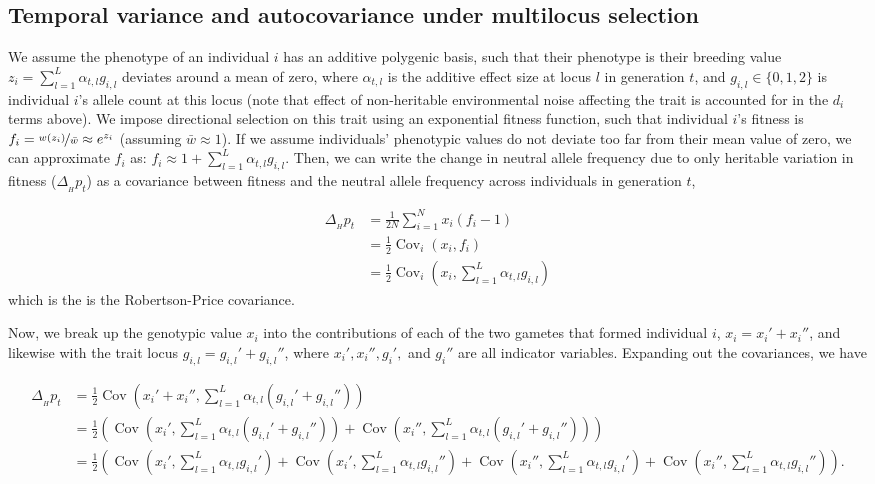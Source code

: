 \documentclass[11pt]{article}
\DeclareMathOperator{\cov}{Cov}
\begin{document}
\subsection{Temporal variance and autocovariance under multilocus selection}
\label{ap:multilocus}

We assume the phenotype of an individual $i$ has an additive polygenic basis,
such that their phenotype is their breeding value $z_i = \sum_{l=1}^L
\alpha_{t,l} g_{i,l}$ deviates around a mean of zero, where $\alpha_{t,l}$ is
the additive effect size at locus $l$ in generation $t$, and $g_{i,l} \in
\{0,1,2\}$ is individual $i$'s allele count at this locus (note that effect of
non-heritable environmental noise affecting the trait is accounted for in the
$d_i$ terms above). We impose directional selection on this trait using an
exponential fitness function, such that individual $i$'s fitness is $f_i =
\nicefrac{w(z_i)}{\bar{w}} \approx e^{z_i}$ (assuming $\bar{w} \approx 1$). If
we assume individuals' phenotypic values do not deviate too far from their mean
value of zero, we can approximate $f_i$ as: $f_i \approx 1 + \sum_{l=1}^L
\alpha_{t,l} g_{i,l}$. Then, we can write the change in neutral allele
frequency due to only heritable variation in fitness ($\Delta_{_H} p_t$) as a
covariance between fitness and the neutral allele frequency across individuals
in generation $t$, 

\begin{align}
  \Delta_{_H} p_t &= \frac{1}{2N} \sum_{i=1}^N x_i \left(f_i - 1\right) \\
                  &= \frac{1}{2} \cov_i(x_i, f_i) \\
                  &= \frac{1}{2} \cov_i(x_i, \sum_{l=1}^L \alpha_{t,l} g_{i,l})
\end{align}
%
which is the is the Robertson-Price covariance.

Now, we break up the genotypic value $x_i$ into the contributions of each of
the two gametes that formed individual $i$, $x_i = x_i' + x_i''$, and likewise
with the trait locus $g_{i,l} = g_{i,l}' + g_{i,l}''$, where $x_i', x_i'',
g_i',$ and $g_i''$ are all indicator variables. Expanding out the covariances, we have

\begin{align}
  \Delta_{_H} p_t &= \frac{1}{2}\cov(x_i' + x_i'', \sum_{l=1}^L \alpha_{t,l} (g_{i,l}' + g_{i,l}'')) \nonumber \\
                &= \frac{1}{2}\left(\cov(x_i', \sum_{l=1}^L \alpha_{t,l} (g_{i,l}' + g_{i,l}'')) + \cov(x_i'', \sum_{l=1}^L \alpha_{t,l} (g_{i,l}' + g_{i,l}'')) \right) \nonumber \\ 
                &= \frac{1}{2} \left( \cov(x_i', \sum_{l=1}^L \alpha_{t,l} g_{i,l}') + \cov(x_i', \sum_{l=1}^L \alpha_{t,l} g_{i,l}'') + \cov(x_i'', \sum_{l=1}^L \alpha_{t,l} g_{i,l}') + \cov(x_i'', \sum_{l=1}^L \alpha_{t,l} g_{i,l}'') \right).
\end{align}
\end{document}
